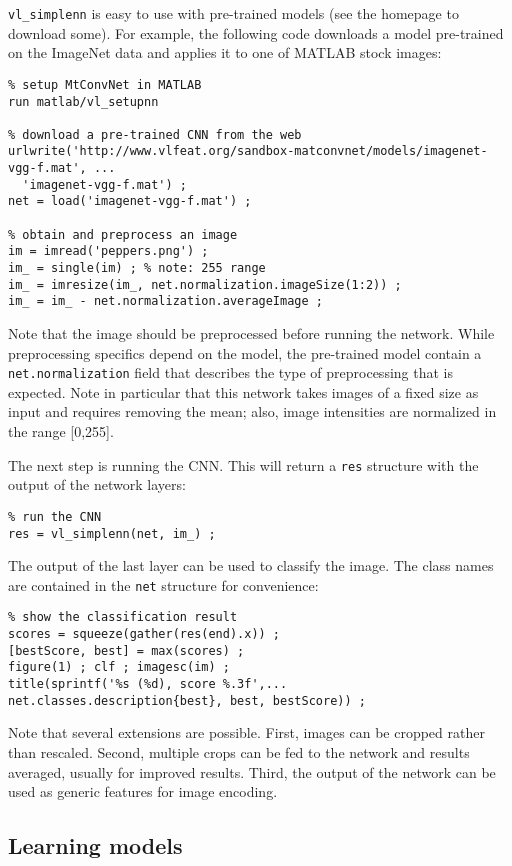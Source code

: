 \documentclass[12pt]{article}
\begin{document}
\verb!vl_simplenn! is easy to use with pre-trained models (see the homepage to download some). For example, the following code downloads a model pre-trained on the ImageNet data and applies it to one of MATLAB stock images:
\begin{verbatim}
% setup MtConvNet in MATLAB
run matlab/vl_setupnn

% download a pre-trained CNN from the web
urlwrite('http://www.vlfeat.org/sandbox-matconvnet/models/imagenet-vgg-f.mat', ...
  'imagenet-vgg-f.mat') ;
net = load('imagenet-vgg-f.mat') ;

% obtain and preprocess an image
im = imread('peppers.png') ;
im_ = single(im) ; % note: 255 range
im_ = imresize(im_, net.normalization.imageSize(1:2)) ;
im_ = im_ - net.normalization.averageImage ;
\end{verbatim}
Note that the image should be preprocessed before running the network. While preprocessing specifics depend on the model, the pre-trained model contain a \verb!net.normalization! field that describes the type of preprocessing that is expected. Note in particular that this network takes images of a fixed size as input and requires removing the mean; also, image intensities are normalized in the range [0,255].

The next step is running the CNN. This will return a \verb!res! structure with the output of the network layers:
\begin{verbatim}
% run the CNN
res = vl_simplenn(net, im_) ;
\end{verbatim}

The output of the last layer can be used to classify the image. The class names are contained in the \verb!net! structure for convenience:
\begin{verbatim}
% show the classification result
scores = squeeze(gather(res(end).x)) ;
[bestScore, best] = max(scores) ;
figure(1) ; clf ; imagesc(im) ;
title(sprintf('%s (%d), score %.3f',...
net.classes.description{best}, best, bestScore)) ;
\end{verbatim}

Note that several extensions are possible. First, images can be cropped rather than rescaled. Second, multiple crops can be fed to the network and results averaged, usually for improved results. Third, the output of the network can be used as generic features for image encoding.

\subsection{Learning models}
\end{document}
